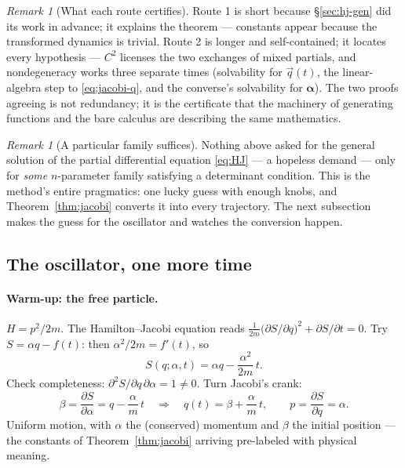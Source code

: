 \documentclass[11pt]{article}
\theoremstyle{plain}
\theoremstyle{definition}
\theoremstyle{remark}
\newtheorem{remark}[theorem]{Remark}
\newcommand{\pd}[2]{\frac{\partial #1}{\partial #2}}
\newcommand{\vq}{\vec{q}}
\begin{document}
\begin{remark}[What each route certifies]
Route 1 is short because \S\ref{sec:hj-gen} did its work in advance;
it explains the theorem --- constants appear because the transformed
dynamics is trivial. Route 2 is longer and self-contained; it locates
every hypothesis --- $C^2$ licenses the two exchanges of mixed partials,
and nondegeneracy works three separate times (solvability for
$\vq(t)$, the linear-algebra step to \eqref{eq:jacobi-q}, and the
converse's solvability for $\boldsymbol{\alpha}$). The two proofs
agreeing is not redundancy; it is the certificate that the machinery
of generating functions and the bare calculus are describing the same
mathematics.
\end{remark}

\begin{remark}[A particular family suffices]
Nothing above asked for the general solution of the partial
differential equation \eqref{eq:HJ} --- a hopeless demand --- only for
\emph{some} $n$-parameter family satisfying a determinant condition.
This is the method's entire pragmatics: one lucky guess with enough
knobs, and Theorem~\ref{thm:jacobi} converts it into every trajectory.
The next subsection makes the guess for the oscillator and watches the
conversion happen.
\end{remark}

\subsection{The oscillator, one more time}
\label{sec:hj-sho}

\paragraph{Warm-up: the free particle.}
$H = p^2/2m$. The Hamilton--Jacobi equation reads
$\frac{1}{2m}\bigl(\partial S/\partial q\bigr)^2 + \partial S/\partial t
= 0$. Try $S = \alpha q - f(t)$: then $\alpha^2/2m = f'(t)$, so
\begin{equation}
  S(q; \alpha, t) = \alpha q - \frac{\alpha^2}{2m}\,t .
\end{equation}
Check completeness: $\partial^2 S/\partial q\,\partial\alpha = 1 \ne 0$.
Turn Jacobi's crank:
\begin{equation}
  \beta = \pd{S}{\alpha} = q - \frac{\alpha}{m}\,t
  \quad\Longrightarrow\quad
  q(t) = \beta + \frac{\alpha}{m}\,t,
  \qquad
  p = \pd{S}{q} = \alpha .
\end{equation}
Uniform motion, with $\alpha$ the (conserved) momentum and $\beta$ the
initial position --- the constants of Theorem~\ref{thm:jacobi} arriving
pre-labeled with physical meaning.
\end{document}
